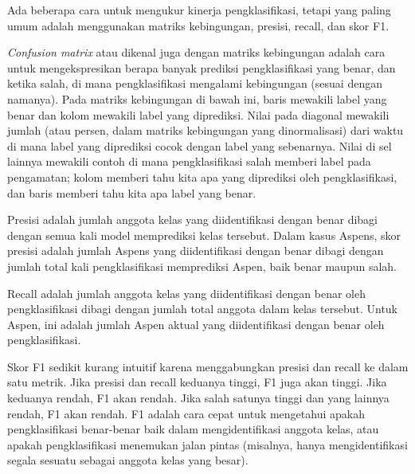 Ada beberapa cara untuk mengukur kinerja pengklasifikasi, tetapi yang paling umum adalah menggunakan matriks kebingungan, presisi, recall, dan skor F1.

\textit{Confusion matrix} atau dikenal juga dengan matriks kebingungan adalah cara untuk mengekspresikan berapa banyak prediksi pengklasifikasi yang benar, dan ketika salah, di mana pengklasifikasi mengalami kebingungan (sesuai dengan namanya). 
Pada matriks kebingungan di bawah ini, baris mewakili label yang benar dan kolom mewakili label yang diprediksi. Nilai pada diagonal mewakili jumlah (atau persen, dalam matriks kebingungan yang dinormalisasi) dari waktu di mana label yang diprediksi cocok dengan label yang sebenarnya. 
Nilai di sel lainnya mewakili contoh di mana pengklasifikasi salah memberi label pada pengamatan; kolom memberi tahu kita apa yang diprediksi oleh pengklasifikasi, dan baris memberi tahu kita apa label yang benar.

Presisi adalah jumlah anggota kelas yang diidentifikasi dengan benar dibagi dengan semua kali model memprediksi kelas tersebut. Dalam kasus Aspens, skor presisi adalah jumlah Aspens yang diidentifikasi dengan benar dibagi dengan jumlah total kali pengklasifikasi memprediksi Aspen, baik benar maupun salah.

Recall adalah jumlah anggota kelas yang diidentifikasi dengan benar oleh pengklasifikasi dibagi dengan jumlah total anggota dalam kelas tersebut. Untuk Aspen, ini adalah jumlah Aspen aktual yang diidentifikasi dengan benar oleh pengklasifikasi.

Skor F1 sedikit kurang intuitif karena menggabungkan presisi dan recall ke dalam satu metrik. Jika presisi dan recall keduanya tinggi, F1 juga akan tinggi. 
Jika keduanya rendah, F1 akan rendah. Jika salah satunya tinggi dan yang lainnya rendah, F1 akan rendah. F1 adalah cara cepat untuk mengetahui apakah pengklasifikasi benar-benar baik dalam mengidentifikasi anggota kelas, atau apakah pengklasifikasi menemukan jalan pintas (misalnya, hanya mengidentifikasi segala sesuatu sebagai anggota kelas yang besar).